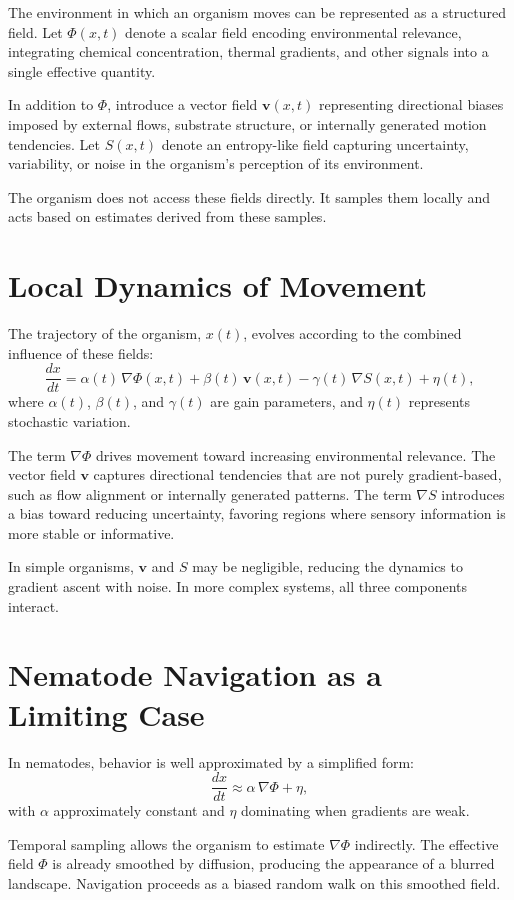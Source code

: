 \documentclass[11pt,oneside]{book}
\begin{document}
The environment in which an organism moves can be represented as a structured field. Let $\Phi(x,t)$ denote a scalar field encoding environmental relevance, integrating chemical concentration, thermal gradients, and other signals into a single effective quantity.

In addition to $\Phi$, introduce a vector field $\mathbf{v}(x,t)$ representing directional biases imposed by external flows, substrate structure, or internally generated motion tendencies. Let $S(x,t)$ denote an entropy-like field capturing uncertainty, variability, or noise in the organism’s perception of its environment.

The organism does not access these fields directly. It samples them locally and acts based on estimates derived from these samples.

\section{Local Dynamics of Movement}

The trajectory of the organism, $x(t)$, evolves according to the combined influence of these fields:
\[
\frac{dx}{dt} = \alpha(t)\,\nabla \Phi(x,t) + \beta(t)\,\mathbf{v}(x,t) - \gamma(t)\,\nabla S(x,t) + \eta(t),
\]
where $\alpha(t)$, $\beta(t)$, and $\gamma(t)$ are gain parameters, and $\eta(t)$ represents stochastic variation.

The term $\nabla \Phi$ drives movement toward increasing environmental relevance. The vector field $\mathbf{v}$ captures directional tendencies that are not purely gradient-based, such as flow alignment or internally generated patterns. The term $\nabla S$ introduces a bias toward reducing uncertainty, favoring regions where sensory information is more stable or informative.

In simple organisms, $\mathbf{v}$ and $S$ may be negligible, reducing the dynamics to gradient ascent with noise. In more complex systems, all three components interact.

\section{Nematode Navigation as a Limiting Case}

In nematodes, behavior is well approximated by a simplified form:
\[
\frac{dx}{dt} \approx \alpha\,\nabla \Phi + \eta,
\]
with $\alpha$ approximately constant and $\eta$ dominating when gradients are weak.

Temporal sampling allows the organism to estimate $\nabla \Phi$ indirectly. The effective field $\Phi$ is already smoothed by diffusion, producing the appearance of a blurred landscape. Navigation proceeds as a biased random walk on this smoothed field.
\end{document}

